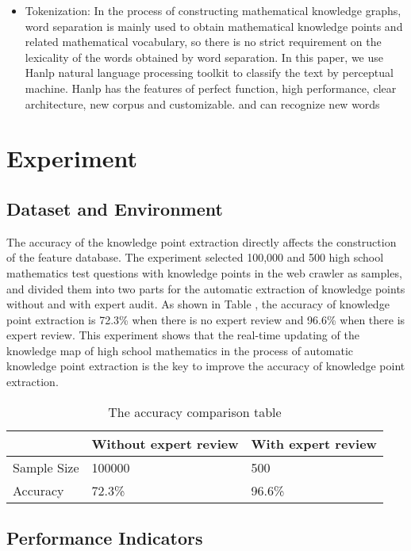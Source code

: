 \begin{itemize}
	\item Tokenization: In the process of constructing mathematical knowledge graphs, word separation is mainly used to obtain mathematical knowledge points and related mathematical vocabulary, so there is no strict requirement on the lexicality of the words obtained by word separation. In this paper, we use Hanlp natural language processing toolkit to classify the text by perceptual machine. Hanlp has the features of perfect function, high performance, clear architecture, new corpus and customizable. and can recognize new words
\end{itemize}

\section{Experiment}

\subsection{Dataset and Environment}

The accuracy of the knowledge point extraction directly affects the construction of the feature database. The experiment selected 100,000 and 500 high school mathematics test questions with knowledge points in the web crawler as samples, and divided them into two parts for the automatic extraction of knowledge points without and with expert audit. As shown in Table , the accuracy of knowledge point extraction is 72.3\% when there is no expert review and 96.6\% when there is expert review. This experiment shows that the real-time updating of the knowledge map of high school mathematics in the process of automatic knowledge point extraction is the key to improve the accuracy of knowledge point extraction.

\begin{table}[h]
	\centering

	\begin{tabular}{|l|l|l|}
	\hline
				& Without expert review & With expert review \\ \hline
	Sample Size & 100000                & 500                \\ \hline
	Accuracy    & 72.3\%                & 96.6\%             \\ \hline
	\end{tabular}
	\caption{The accuracy comparison table}
\end{table}

\subsection{Performance Indicators}


